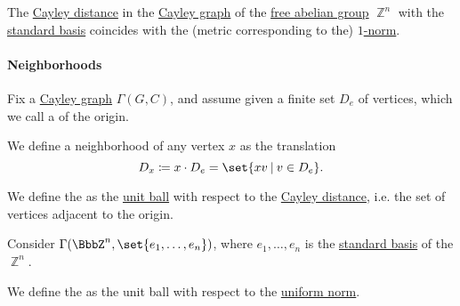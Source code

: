 \begin{proposition}\label{thm:cayley_distance_integer_lattice}
  The \hyperref[def:cayley_distance]{Cayley distance} in the \hyperref[def:cayley_graph]{Cayley graph} of the \hyperref[def:free_abelian_group]{free abelian group} \( \BbbZ^n \) with the \hyperref[def:sequence_space]{standard basis} coincides with the (metric corresponding to the) \hyperref[def:p_norm]{\( 1 \)-norm}.
\end{proposition}

\paragraph{Neighborhoods}

\begin{definition}\label{def:cayley_graph_neighborhood}
  Fix a \hyperref[def:cayley_graph]{Cayley graph} \( \Gamma(G, C) \), and assume given a finite set \( D_e \) of vertices, which we call a  of the origin.

  We define a neighborhood of any vertex \( x \) as the translation
  \begin{equation*}
    D_x \coloneqq x \cdot D_e = \set{ xv \given v \in D_e }.
  \end{equation*}

  \begin{thmenum}
     We define the  as the \hyperref[def:metric_space/ball]{unit ball} with respect to the \hyperref[def:cayley_distance]{Cayley distance}, i.e. the set of vertices adjacent to the origin.

     Consider \( \Gamma(\BbbZ^n, \set{ e_1, \ldots, e_n }) \), where \( e_1, \ldots, e_n \) is the \hyperref[def:sequence_space]{standard basis} of the \hyperref[def:free_abelian_group]{\( \BbbZ^n \)}.

    We define the  as the unit ball with respect to the \hyperref[def:p_norm]{uniform norm}.
  \end{thmenum}
\end{definition}

